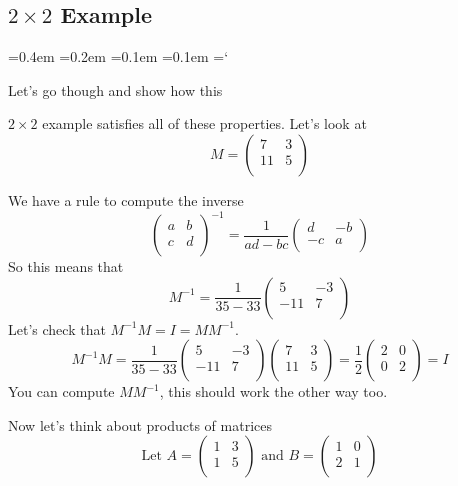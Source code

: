  
\subsection*{$2\times2$ Example}

{\ttfamily
{}\font=0.4em
\font=0.2em
\font=0.1em
\font=0.1em
\hyphenchar\font=`\-


\hypertarget{scripts_inverse_matrix_2by2_example}{Let's go though and show how this} $2 \times 2$ example satisfies all of these properties. Let's look at 
\[
M =
\left( \begin{array}{cc}
7 & 3  \\
11 & 5 \\
\end{array} \right)
\]

We have a rule to compute the inverse
\[
\left( \begin{array}{cc}
a & b  \\
c & d \\
\end{array} \right)^{-1}
=
\frac{1}{ad-bc}\left( \begin{array}{cc}
d & -b  \\
-c & a \\
\end{array} \right)
\]
So this means that 
\[
M^{-1} =
\frac{1}{35-33}
\left( \begin{array}{cc}
5 & -3  \\
-11 & 7 \\
\end{array} \right)
\]
Let's check that $M^{-1}M = I = M M^{-1}$.
\[
M^{-1}M =
\frac{1}{35-33}
\left( \begin{array}{cc}
5 & -3  \\
-11 & 7 \\
\end{array} \right)
\left( \begin{array}{cc}
7 & 3  \\
11 & 5 \\
\end{array} \right)
=
\frac{1}{2}
\left( \begin{array}{cc}
2 & 0  \\
0 &2 \\
\end{array} \right)
= I
\] 
You can compute $M M^{-1}$, this should work the other way too. 

Now let's think about products of matrices
\[
\text{Let }
A =
\left( \begin{array}{cc}
1 & 3  \\
1 & 5 \\
\end{array} \right)
\text{ and }
B=
\left( \begin{array}{cc}
1 & 0  \\
2 & 1 \\
\end{array} \right)
\]

}
